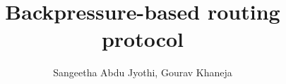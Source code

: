 \documentclass[12pt, a4paper]{article}
\begin{document}
\title{\bf{Backpressure-based routing protocol}}
\author{Sangeetha Abdu Jyothi, Gourav Khaneja}
\date{}
\maketitle


\bigskip
\bigskip

\bigskip
\bigskip

\bigskip
\bigskip

\bigskip
\bigskip


\end{document}
